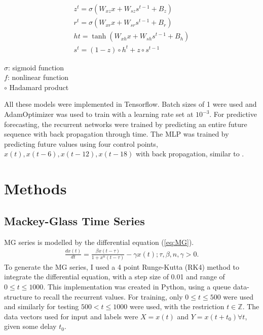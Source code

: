 \documentclass[11pt]{article}
\newcommand{\Z}{\mathbb{Z}}
\begin{document}
\begin{equation}
\begin{split}
  z^{t} = \sigma(W_{xz}x + W_{sz}s^{t-1} + B_z) \\
  r^{t} = \sigma(W_{xr}x + W_{sr}s^{t-1} + B_r) \\
  h{t} = \tanh(W_{xh}x + W_{sh}s^{t-1} + B_h) \\
  s^{t} = (1-z) \circ h^{t} + z \circ s^{t-1} 
\end{split}
\label{eq:GRU_h}
\end{equation}
\begin{center}$\sigma$: sigmoid function\\$f$: nonlinear function\\$\circ$ Hadamard product\end{center}
All these models were implemented in Tensorflow. Batch sizes of 1 were
used and AdamOptimizer \cite{adam} was used to train with a learning rate set at $10^{-3}$. For predictive forecasting, the recurrent networks
were trained by predicting an entire future sequence with back propagation through
time. The MLP was trained by predicting future values using four
control points, $x(t), x(t-6), x(t-12), x(t-18)$ with back propagation, similar to \cite{tr}.

\section {Methods}
\subsection {Mackey-Glass Time Series}
MG series is modelled by the differential equation (\ref{eq:MG}).
\begin{equation}
  \begin{split}
\frac{dx(t)}{dt} = \frac{\beta x(t-\tau)}{1+x^n(t- \tau)} - \gamma x(t); \tau,\beta,n,\gamma > 0.
\label{eq:MG}
  \end{split}
\end{equation}
To generate the MG series, I used a 4 point Runge-Kutta (RK4) method to
integrate the differential equation, with a step size of
0.01 and range of $0 \leq t \leq 1000$. This implementation was created in Python, using a queue
data-structure to recall the recurrent values. For training, only
$0 \leq t \leq 500$ were used and similarly for testing 
$500 < t \leq 1000$  were used, with the restriction $t \in \Z$. The data vectors used
for input and labels were $X = x(t) $ and $ Y = x(t+t_0) \forall
t$, given some delay $t_0$. 
\end{document}
